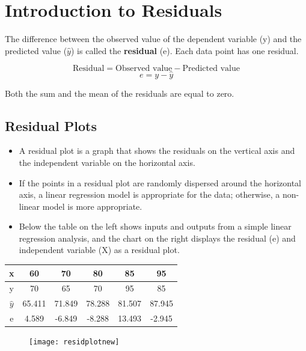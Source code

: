 \documentclass[residuals.tex]{subfiles}
\begin{document}
\section{Introduction to Residuals}

The difference between the observed value of the dependent variable (y) and the predicted value ($\hat{y}$) is called the \textbf{residual} (e). Each data point has one residual.

\begin{framed}
\[\mbox{Residual} = \mbox{Observed value} - \mbox{Predicted value}\] 
\[e = y - \hat{y}\]
\end{framed}

Both the sum and the mean of the residuals are equal to zero. 
\newpage

\subsection*{Residual Plots}
\begin{itemize}
\item A residual plot is a graph that shows the residuals on the vertical axis and the independent variable on the horizontal axis. \item If the points in a residual plot are randomly dispersed around the horizontal axis, a linear regression model is appropriate for the data; otherwise, a non-linear model is more appropriate.

\item Below the table on the left shows inputs and outputs from a simple linear regression analysis, and the chart on the right displays the residual (e) and independent variable (X) as a residual plot.
\end{itemize}

\begin{center}
\begin{tabular}{|c|c|c|c|c|c|}
	\hline   x	& 60	& 70	& 80	& 85 &	95 \\ \hline
	y	& 70	& 65	& 70	& 95 &	85 \\ \hline
	$\hat{y}$	& 65.411 & 	71.849	& 78.288	& 81.507	& 87.945 \\ \hline
	e	& 4.589	& -6.849 &	-8.288&	13.493	& -2.945 \\ \hline
\end{tabular} 
\end{center}
\begin{figure}[h!]
\centering
\texttt{[image: residplotnew]}

\end{figure}
\end{document}
